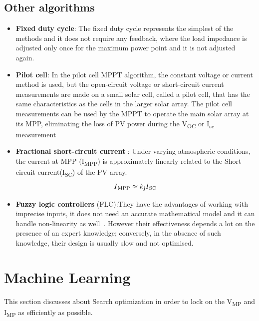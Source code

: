 {\subsection{Other algorithms}
  \begin{itemize}
  \item {\bf Fixed duty cycle}: The fixed duty cycle represents the simplest of the methods and it does not require any feedback, where the load impedance is adjusted only once for the maximum power point and it is not adjusted again.
  \item {\bf Pilot cell}: In the pilot cell MPPT algorithm, the constant voltage or current method is used, but the open-circuit voltage or short-circuit current measurements are made on a small solar cell, called a pilot cell, that has the same characteristics as the cells in the larger solar array. The pilot cell measurements can be used by the MPPT to operate the main solar array at its MPP, eliminating the loss of \ac{PV} power during the V\textsubscript{OC} or I\textsubscript{sc} measurement
  \item {\bf Fractional short-circuit current }: Under varying atmospheric conditions, the current at \ac{MPP} (I\textsubscript{MPP}) is approximately linearly related to the Short-circuit current(I\textsubscript{SC}) of the \ac{PV} array. \newline
    \begin{equation}
      \begin{aligned}
    I\textsubscript{MPP} \approx k\textsubscript{j}I\textsubscript{SC}
    \label{eq:equ_fracoc_cur}
    \end{aligned}
    \end{equation}
   \item {\bf Fuzzy logic controllers} (FLC):They have the advantages of working with imprecise inputs, it does not need an accurate mathematical model and it can handle non-linearity as well~\cite{messai2011maximum}. However their effectiveness depends a lot on the presence of an expert knowledge; conversely, in the absence of such knowledge, their design is usually slow and not optimised. 
  \end{itemize} 
  





\section{Machine Learning }
This section discusses about Search optimization in order to lock on the  V\textsubscript{MP} and I\textsubscript{MP} as efficiently as possible.\\

}
